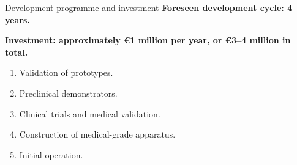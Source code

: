 \documentclass[aspectratio=169,11pt]{beamer}
\newcommand{\hi}[1]{\textcolor{crRed}{#1}}
\begin{document}
\begin{frame}{Development programme and investment}
\small
\textbf{Foreseen development cycle: \hi{4 years}.}
\par\vspace{3mm}
\textbf{Investment: approximately \hi{\euro1 million per year}, or \hi{\euro3--4 million in total}.}
\par\vspace{5mm}
\begin{enumerate}
\item Validation of prototypes.
\item Preclinical demonstrators.
\item Clinical trials and medical validation.
\item Construction of medical-grade apparatus.
\item Initial operation.
\end{enumerate}
\end{frame}
\end{document}
